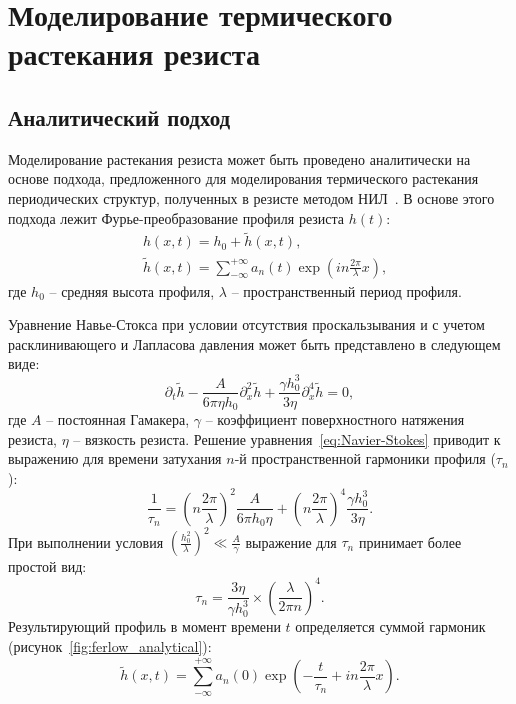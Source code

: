 \section{Моделирование термического растекания резиста}


\subsection{Аналитический подход}
Моделирование растекания резиста может быть проведено аналитически на основе подхода, предложенного для моделирования термического растекания периодических структур, полученных в резисте методом НИЛ~\cite{Leveder_2008, Leveder_2011}. В основе этого подхода лежит Фурье-преобразование профиля резиста $h(t)$:
\begin{equation}
	\begin{aligned}
		& h(x, t) = h_0 + \tilde{h}(x, t), \\
		& \tilde{h}(x, t) = \sum_{-\infty}^{+\infty} a_n(t) \exp \left(i n \frac{2 \pi}{\lambda} x\right),
	\end{aligned}
\end{equation}
где $h_0$ -- средняя высота профиля, $\lambda$ -- пространственный период профиля.

Уравнение Навье-Стокса при условии отсутствия проскальзывания и с учетом расклинивающего и Лапласова давления может быть представлено в следующем виде:
\begin{equation} \label{eq:Navier-Stokes}
	\partial_t \tilde{h}-\frac{A}{6 \pi \eta h_0} \partial_x^2 \tilde{h}+\frac{\gamma h_0^3}{3 \eta} \partial_x^4 \tilde{h} = 0,
\end{equation}
где $A$ -- постоянная Гамакера, $\gamma$ -- коэффициент поверхностного натяжения резиста, $\eta$ -- вязкость резиста. Решение уравнения~\ref{eq:Navier-Stokes} приводит к выражению для времени затухания $n$-й пространственной гармоники профиля ($\tau_n$):
\begin{equation}
	\frac{1}{\tau_n}=\left(n \frac{2 \pi}{\lambda}\right)^2 \frac{A}{6 \pi h_0 \eta}+\left(n \frac{2 \pi}{\lambda}\right)^4 \frac{\gamma h_0^3}{3 \eta}.
\end{equation}
При выполнении условия $\left(\frac{\displaystyle h_0^2}{\displaystyle \lambda}\right)^2 \ll \frac{\displaystyle A}{\displaystyle \gamma}$ выражение для $\tau_n$ принимает более простой вид:
\begin{equation}
	\tau_n=\frac{3 \eta}{\gamma h_0^3} \times\left(\frac{\lambda}{2 \pi n}\right)^4.
\end{equation}
Результирующий профиль в момент времени $t$ определяется суммой гармоник (рисунок~\ref{fig:ferlow_analytical}):
\begin{equation}
	\tilde{h}(x, t)=\sum_{-\infty}^{+\infty} a_n(0) \exp \left(-\frac{t}{\tau_n}+i n \frac{2 \pi}{\lambda} x\right).
\end{equation}

